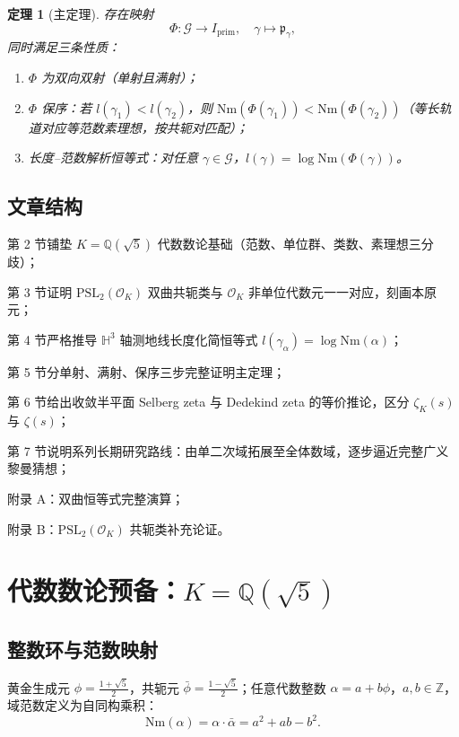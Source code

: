 \documentclass[12pt,a4paper]{article}
\newtheorem{theorem}{定理}[section]
\begin{document}
\begin{theorem}[主定理]
存在映射
\[
\Phi: \mathcal{G} \to I_{\mathrm{prim}}, \quad \gamma \mapsto \mathfrak{p}_\gamma,
\]
同时满足三条性质：
\begin{enumerate}[label=(\arabic*)]
\item $\Phi$ 为双向双射（单射且满射）；
\item $\Phi$ 保序：若 $l(\gamma_1) < l(\gamma_2)$，则 $\mathrm{Nm}(\Phi(\gamma_1)) < \mathrm{Nm}(\Phi(\gamma_2))$（等长轨道对应等范数素理想，按共轭对匹配）；
\item 长度--范数解析恒等式：对任意 $\gamma \in \mathcal{G}$，$l(\gamma) = \log \mathrm{Nm}(\Phi(\gamma))$。
\end{enumerate}
\end{theorem}

\subsection{文章结构}

第 2 节铺垫 $K = \mathbb{Q}(\sqrt{5})$ 代数数论基础（范数、单位群、类数、素理想三分歧）；

第 3 节证明 $\mathrm{PSL}_2(\mathcal{O}_K)$ 双曲共轭类与 $\mathcal{O}_K$ 非单位代数元一一对应，刻画本原元；

第 4 节严格推导 $\mathbb{H}^3$ 轴测地线长度化简恒等式 $l(\gamma_\alpha) = \log \mathrm{Nm}(\alpha)$；

第 5 节分单射、满射、保序三步完整证明主定理；

第 6 节给出收敛半平面 Selberg zeta 与 Dedekind zeta 的等价推论，区分 $\zeta_K(s)$ 与 $\zeta(s)$；

第 7 节说明系列长期研究路线：由单二次域拓展至全体数域，逐步逼近完整广义黎曼猜想；

附录 A：双曲恒等式完整演算；

附录 B：$\mathrm{PSL}_2(\mathcal{O}_K)$ 共轭类补充论证。

\section{代数数论预备：$K = \mathbb{Q}(\sqrt{5})$}

\subsection{整数环与范数映射}

黄金生成元 $\phi = \frac{1+\sqrt{5}}{2}$，共轭元 $\bar{\phi} = \frac{1-\sqrt{5}}{2}$；任意代数整数 $\alpha = a + b\phi$，$a, b \in \mathbb{Z}$，域范数定义为自同构乘积：
\[
\mathrm{Nm}(\alpha) = \alpha \cdot \bar{\alpha} = a^2 + ab - b^2.
\]
\end{document}
